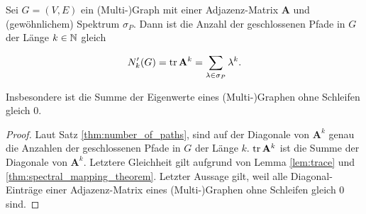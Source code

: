             \begin{corollary} \label{cor:number_of_paths_closed}

                Sei $G = (V, E)$ ein (Multi-)Graph mit einer Adjazenz-Matrix $\mathbf A$ und (gewöhnlichem) Spektrum $\sigma_P$.
                Dann ist die Anzahl der geschlossenen Pfade in $G$ der Länge $k \in \mathbb N$ gleich

                \begin{align*}
                    N_k^\prime(G)
                    =
                    \operatorname{tr} \mathbf A^k
                    =
                    \sum_{\lambda \in \sigma_P} \lambda^k.
                \end{align*}

                Insbesondere ist die Summe der Eigenwerte eines (Multi-)Graphen ohne Schleifen gleich $0$.

            \end{corollary}

            \begin{proof}

                Laut Satz \ref{thm:number_of_paths}, sind auf der Diagonale von $\mathbf A^k$ genau die Anzahlen der geschlossenen Pfade in $G$ der Länge $k$.
                $\operatorname{tr} \mathbf A^k$ ist die Summe der Diagonale von $\mathbf A^k$.
                Letztere Gleichheit gilt aufgrund von Lemma \ref{lem:trace} und \ref{thm:spectral_mapping_theorem}.
                Letzter Aussage gilt, weil alle Diagonal-Einträge einer Adjazenz-Matrix eines (Multi-)Graphen ohne Schleifen gleich $0$ sind.

            \end{proof}

